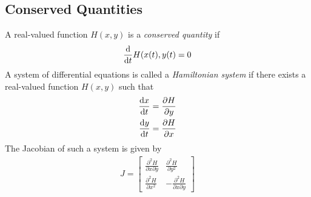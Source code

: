 \documentclass[12pt,1in]{article}
\begin{document}
\subsection{Conserved Quantities}
A real-valued function $H(x,y)$ is a \textit{conserved quantity} if
\begin{align}
\derivative{}{t}H(x(t), y(t) = 0
\end{align}
A system of differential equations is called a \textit{Hamiltonian system} if there exists a real-valued function $H(x,y)$ such that 
\begin{align}
\derivative{x}{t} &= \frac{\partial H}{\partial y} \label{ham_1} \\
\derivative{y}{t} &= \frac{\partial H}{\partial x} \label{ham_2}
\end{align}
The Jacobian of such a system is given by 
\begin{align}
J = \begin{bmatrix}
\frac{\partial^2H}{\partial x \partial y} & \frac{\partial^2H}{\partial y^2} \\
\frac{\partial^2H}{\partial x^2} & -\frac{\partial^2H}{\partial x \partial y}
\end{bmatrix}
\end{align}
\end{document}
